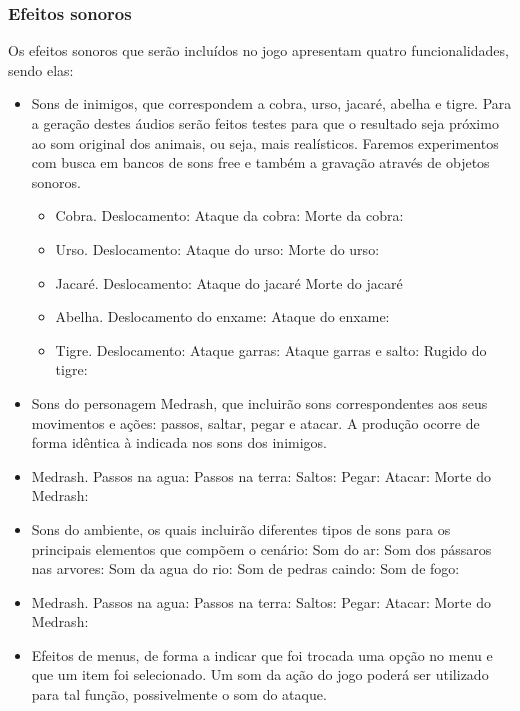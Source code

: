 \subsubsection{Efeitos sonoros}
Os efeitos sonoros que serão incluídos no jogo apresentam quatro
 funcionalidades, sendo elas:
\begin{itemize}
\item Sons de inimigos, que correspondem a cobra, urso, jacaré, abelha e tigre. 
Para a geração destes áudios serão feitos testes para que o resultado 
seja próximo ao som original dos animais, ou seja, mais realísticos. 
Faremos experimentos com busca em bancos de sons free e também a 
gravação através de objetos sonoros. 
\begin{itemize}
\item Cobra.
Deslocamento:
Ataque da cobra:
Morte da cobra:
\item Urso.
Deslocamento:
Ataque do urso:
Morte do urso:
\item Jacaré.
Deslocamento:
Ataque do jacaré
Morte do jacaré
\item Abelha.
Deslocamento do enxame:
Ataque do enxame:
\item Tigre.
Deslocamento:
Ataque garras:
Ataque garras e salto:
Rugido do tigre:
\end{itemize}

\item Sons do personagem Medrash, que incluirão sons correspondentes
 aos seus movimentos e ações: passos, saltar, pegar e atacar. A
 produção ocorre de forma idêntica à indicada nos sons dos inimigos.

\item Medrash.
Passos na agua:
Passos na terra:
Saltos:
Pegar:
Atacar:
Morte do Medrash:

\item Sons do ambiente, os quais incluirão diferentes tipos de sons para os
principais elementos que compõem o cenário:
Som do ar:
Som dos pássaros nas arvores:
Som da agua do rio:
Som de pedras caindo:
Som de fogo:

\item Medrash.
Passos na agua:
Passos na terra:
Saltos:
Pegar:
Atacar:
Morte do Medrash:

\item Efeitos de menus, de forma a indicar que foi trocada uma opção no 
menu e que um item foi selecionado. Um som da ação do jogo poderá ser
 utilizado para tal função, possivelmente o som do ataque.
\end{itemize}

